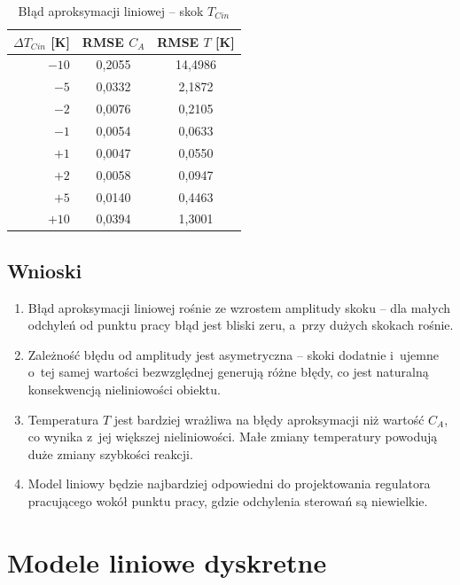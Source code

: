 \documentclass[a4paper,12pt]{article}
\begin{document}
\begin{table}[H]
\centering
\caption{Błąd aproksymacji liniowej -- skok $T_{Cin}$}
\label{tab:1c_4}
\begin{tabular}{r|c|c}
\hline
$\Delta T_{Cin}$ [K] & RMSE $C_A$ & RMSE $T$ [K] \\
\hline
$-10$ & 0{,}2055 & 14{,}4986 \\
$-5$ & 0{,}0332 & 2{,}1872 \\
$-2$ & 0{,}0076 & 0{,}2105 \\
$-1$ & 0{,}0054 & 0{,}0633 \\
$+1$ & 0{,}0047 & 0{,}0550 \\
$+2$ & 0{,}0058 & 0{,}0947 \\
$+5$ & 0{,}0140 & 0{,}4463 \\
$+10$ & 0{,}0394 & 1{,}3001 \\
\hline
\end{tabular}
\end{table}

\subsection*{Wnioski}

\begin{enumerate}
    \item Błąd aproksymacji liniowej rośnie ze wzrostem amplitudy skoku -- dla małych odchyleń od punktu pracy błąd jest bliski zeru, a~przy dużych skokach rośnie.

    \item Zależność błędu od amplitudy jest asymetryczna -- skoki dodatnie i~ujemne o~tej samej wartości bezwzględnej generują różne błędy, co jest naturalną konsekwencją nieliniowości obiektu.

    \item Temperatura $T$ jest bardziej wrażliwa na błędy aproksymacji niż wartość $C_A$, co wynika z~jej większej nieliniowości. Małe zmiany temperatury powodują duże zmiany szybkości reakcji.

    \item Model liniowy będzie najbardziej odpowiedni do projektowania regulatora pracującego wokół punktu pracy, gdzie odchylenia sterowań są niewielkie.
\end{enumerate}

\newpage
\section{Modele liniowe dyskretne}
\end{document}
